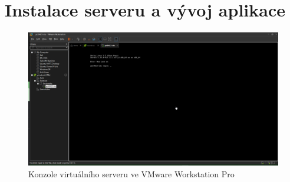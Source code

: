 \chapter{Instalace serveru a vývoj aplikace}

\begin{figure}
    \centering
    \includegraphics[width=\textwidth]{Figures/vmware_console.png}
    \caption{Konzole virtuálního serveru ve VMware Workstation Pro}
    \label{fig:vmware-workstation-pro}
\end{figure}

